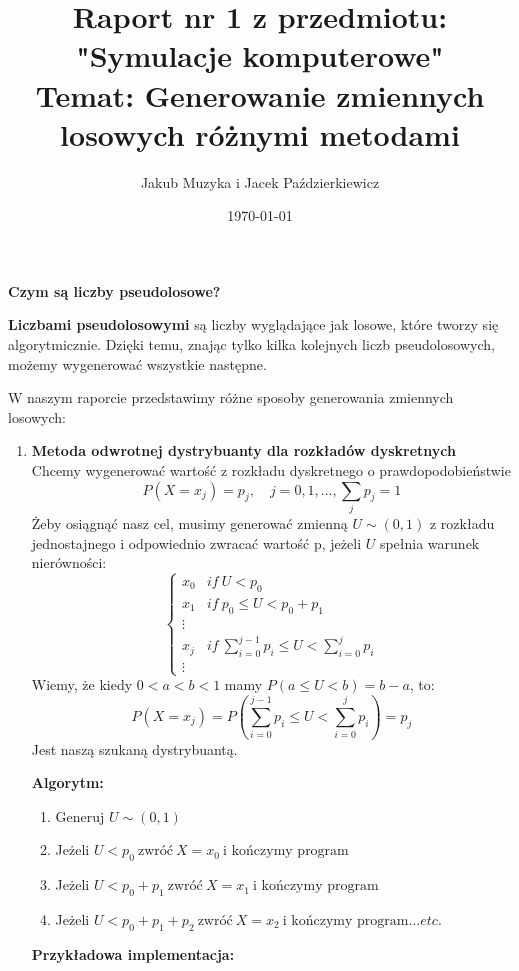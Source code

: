 \documentclass{article}
\author{Jakub Muzyka i Jacek Paździerkiewicz}
\title{Raport nr 1 z przedmiotu:\\ "Symulacje komputerowe"\\ Temat: Generowanie zmiennych losowych różnymi metodami}
\date{\today}
\begin{document}
	\maketitle
	\large
	\textbf{Czym są liczby pseudolosowe?}
	
	\textbf{Liczbami pseudolosowymi} są liczby wyglądające jak losowe, które tworzy się algorytmicznie. Dzięki temu, znając tylko kilka kolejnych liczb pseudolosowych, możemy wygenerować wszystkie następne.
	
	W naszym raporcie przedstawimy różne sposoby generowania zmiennych losowych:
	\begin{enumerate}
		\item \textbf{Metoda odwrotnej dystrybuanty dla rozkładów dyskretnych} \\
		
		Chcemy wygenerować wartość z rozkładu dyskretnego o prawdopodobieństwie $$P(X=x_{j}) = p_{j},\hspace{1em}j=0,1,\ldots,\sum_j p_{j} = 1$$
		Żeby osiągnąć nasz cel, musimy generować zmienną $U\sim (0,1)$ z rozkładu jednostajnego i odpowiednio zwracać wartość p, jeżeli $U$ spełnia warunek nierówności:
		$$\left\{
		\begin{array}{ccccc}
			x_{0}&if~U < p_{0}\\
			x_{1}&if~p_{0}\le U<p_{0} + p_{1}\\
			\vdots\\
			x_{j}& if~\sum_{i=0}^{j-1} p_{i}\le U < \sum_{i=0}^{j} p_{i}\\
			\vdots
		\end{array}
		\right.$$
		Wiemy, że kiedy $0<a<b<1$ mamy $P(a\le U < b) = b-a$, to:
		$$P(X = x_{j}) = P(\sum_{i=0}^{j-1} p_{i}\le U < \sum_{i=0}^{j} p_{i}) = p_{j}$$ Jest naszą szukaną dystrybuantą.
		
		\textbf{Algorytm:}
		\begin{enumerate}
			\item Generuj $U\sim (0,1)$
			\item Jeżeli $U < p_{0}~ \text{zwróć}~X=x_{0}~ \text{i kończymy program}$
			\item Jeżeli $U < p_{0} + p_{1}~\text{zwróć}~X=x_{1}~\text{i kończymy program}$
			\item Jeżeli $U < p_{0} + p_{1} + p_{2}~\text{zwróć}~X=x_{2}~\text{i kończymy program}\ldots etc.$
		\end{enumerate}
		\textbf{Przykładowa implementacja:}
		

\end{enumerate}
\end{document}
